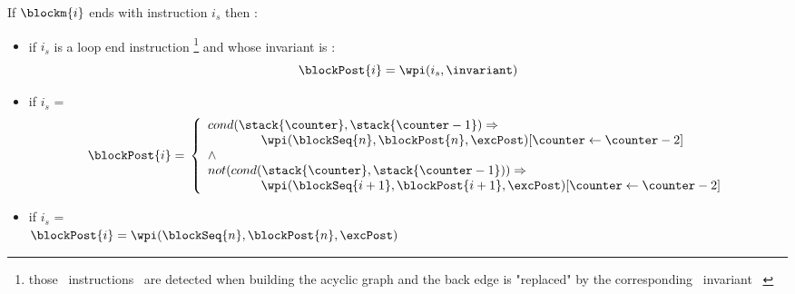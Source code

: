  \begin{defn}\label{post}
 If $\blockm{i}$ ends with instruction $i_s$ then :
 \begin{itemize} 
 \item  if  $i_s$ is a loop end instruction \wpi \footnote{those \ instructions \ are detected when building the acyclic  graph and the 
 back edge is "replaced"  by the corresponding \ invariant \ \invariant  } and whose invariant is \invariant: 
 $$ \blockPost{i} =  \wpi(  i_s, \invariant)  $$ 
 \item if  $i_s$ =   \\
$$
\blockPost{i} =  \\
\left\{
\begin{array}{l}
cond( \stack{\counter}, \stack{\counter - 1} )   \Rightarrow \\
\phantom{ \counter }   \wpi(\blockSeq{n}, \blockPost{n} ,\excPost )[ \counter \leftarrow \counter -2 ]  \\
\wedge \\
 not ( cond( \stack{\counter}, \stack{\counter - 1} )  )   \Rightarrow \\
\phantom{ \counter}    \wpi(\blockSeq{i+1}, \blockPost{i+1},\excPost ) [ \counter \leftarrow \counter -2 ]      \\                             
\end{array}
\right.
$$
\item if  $i_s$ =   \\ 
$\blockPost{i} =  \wpi(\blockSeq{n}, \blockPost{n} , \excPost )$ \\


\end{itemize}
\end{defn}
